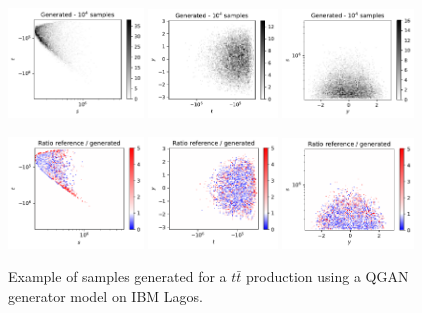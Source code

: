 \documentclass[twocolumn,preprintnumbers,superscriptaddress]{revtex4-2}
\begin{document}
\begin{figure}

  \includegraphics[width=0.32\textwidth]{plots/hardware_1k/ibm_lagos/s-t_FAKE_IBM_10k.pdf}%
  \includegraphics[width=0.305\textwidth]{plots/hardware_1k/ibm_lagos/t-y_FAKE_IBM_10k.pdf}%
  \includegraphics[width=0.31\textwidth]{plots/hardware_1k/ibm_lagos/y-s_FAKE_IBM_10k.pdf}

  \includegraphics[width=0.32\textwidth]{plots/hardware_1k/ibm_lagos/s-t_RATIO_IBM_10k.pdf}%
  \includegraphics[width=0.305\textwidth]{plots/hardware_1k/ibm_lagos/t-y_RATIO_IBM_10k.pdf}%
  \includegraphics[width=0.31\textwidth]{plots/hardware_1k/ibm_lagos/y-s_RATIO_IBM_10k.pdf}

  \caption{\label{fig:3dgauss}Example of samples generated for a $t\bar{t}$
    production using a QGAN generator model on IBM Lagos.}
\end{figure}
\end{document}

